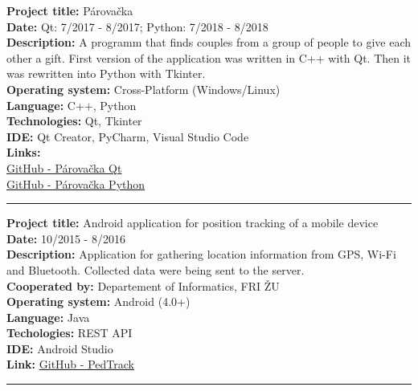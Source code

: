 \documentclass[slovak]{article}
\begin{document}
\noindent
\textbf{Project title:} Párovačka\\
\textbf{Date:} Qt: 7/2017 - 8/2017; Python: 7/2018 - 8/2018\\
\textbf{Description:} A programm that finds couples from a group of people to give each other a gift. First version of the application was written in C++ with Qt. Then it was rewritten into Python with Tkinter.\\
\textbf{Operating system:} Cross-Platform (Windows/Linux)\\
\textbf{Language:} C++, Python\\
\textbf{Technologies:} Qt, Tkinter\\
\textbf{IDE:} Qt Creator, PyCharm, Visual Studio Code\\
\textbf{Links:}\\
\href{https://github.com/kyberdrb/Parovacka\_Qt}{GitHub - Párovačka Qt}\\
\href{https://github.com/kyberdrb/Parovacka\_Python}{GitHub - Párovačka Python}

\begin{center}\rule{3in}{0.4pt}\end{center}

\noindent
\textbf{Project title:} Android application for position tracking of a mobile device\\
\textbf{Date:} 10/2015 - 8/2016\\
\textbf{Description:} Application for gathering location information from GPS, Wi-Fi and Bluetooth. Collected data were being sent to the server.\\
\textbf{Cooperated by:} Departement of Informatics, FRI ŽU\\
\textbf{Operating system:} Android (4.0+)\\
\textbf{Language:} Java\\
\textbf{Techologies:} REST API\\
\textbf{IDE:} Android Studio\\
\textbf{Link:} \href{https://github.com/kyberdrb/PedTrack}{GitHub - PedTrack}

\begin{center}\rule{3in}{0.4pt}\end{center}
\end{document}
